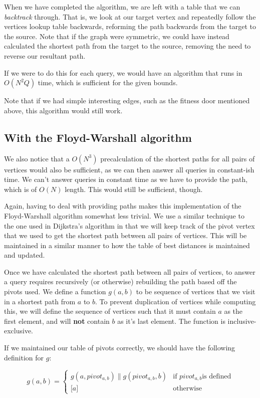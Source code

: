 When we have completed the algorithm, we are left with a table that we can
\emph{backtrack} through. That is, we look at our target vertex and repeatedly
follow the vertices lookup table backwards, reforming the path backwards from
the target to the source. Note that if the graph were symmetric, we could have
instead calculated the shortest path from the target to the source, removing
the need to reverse our resultant path.

If we were to do this for each query, we would have an algorithm that runs in
$O(N^2Q)$ time, which is sufficient for the given bounds.

Note that if we had simple interesting edges, such as the fitness door
mentioned above, this algorithm would still work.

\subsection*{With the Floyd-Warshall algorithm}

We also notice that a $O(N^3)$ precalculation of the shortest paths for all
pairs of vertices would also be sufficient, as we can then answer all queries
in constant-ish time. We can't answer queries in constant time as we have to
provide the path, which is of $O(N)$ length. This would still be sufficient,
though.

Again, having to deal with providing paths makes this implementation of the
Floyd-Warshall algorithm somewhat less trivial. We use a similar technique to
the one used in Dijkstra's algorithm in that we will keep track of the pivot
vertex that we used to get the shortest path between all pairs of vertices.
This will be maintained in a similar manner to how the table of best distances
is maintained and updated.

Once we have calculated the shortest path between all pairs of vertices, to
answer a query requires recursively (or otherwise) rebuilding the path based
off the pivots used. We define a function $g(a, b)$ to be sequence of vertices
that we visit in a shortest path from $a$ to $b$. To prevent duplication of
vertices while computing this, we will define the sequence of vertices such
that it must contain $a$ as the first element, and will {\bf not} contain $b$
as it's last element. The function is inclusive-exclusive.

If we maintained our table of pivots correctly, we should have the following
definition for $g$:

\[g(a, b) = \left\{
  \begin{array}{lr}
      g(a, pivot_{a, b}) \| g(pivot_{a, b}, b) & \text{if } pivot_{a, b} \text{is defined} \\
      {[}a{]} & \text{otherwise}
  \end{array}
\right.
\]

